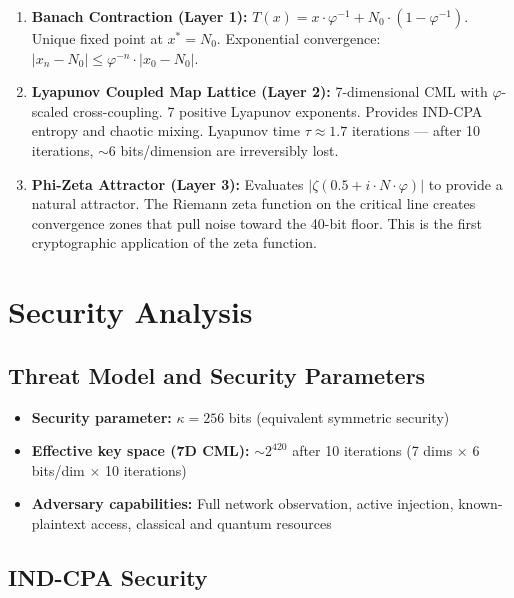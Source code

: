 \documentclass{article}
\begin{document}
\begin{enumerate}
    \item \textbf{Banach Contraction (Layer 1):} $T(x) = x \cdot \varphi^{-1} + N_0 \cdot (1-\varphi^{-1})$. Unique fixed point at $x^* = N_0$. Exponential convergence: $|x_n - N_0| \leq \varphi^{-n} \cdot |x_0 - N_0|$.
    
    \item \textbf{Lyapunov Coupled Map Lattice (Layer 2):} 7-dimensional CML with $\varphi$-scaled cross-coupling. 7 positive Lyapunov exponents. Provides IND-CPA entropy and chaotic mixing. Lyapunov time $\tau \approx 1.7$ iterations — after 10 iterations, $\sim$6 bits/dimension are irreversibly lost.
    
    \item \textbf{Phi-Zeta Attractor (Layer 3):} Evaluates $|\zeta(0.5 + i \cdot N \cdot \varphi)|$ to provide a natural attractor. The Riemann zeta function on the critical line creates convergence zones that pull noise toward the 40-bit floor. This is the first cryptographic application of the zeta function.
\end{enumerate}

\section{Security Analysis}

\subsection{Threat Model and Security Parameters}

\begin{itemize}
    \item \textbf{Security parameter:} $\kappa = 256$ bits (equivalent symmetric security)
    \item \textbf{Effective key space (7D CML):} $\sim 2^{420}$ after 10 iterations (7 dims $\times$ 6 bits/dim $\times$ 10 iterations)
    \item \textbf{Adversary capabilities:} Full network observation, active injection, known-plaintext access, classical and quantum resources
\end{itemize}

\subsection{IND-CPA Security}
\end{document}
